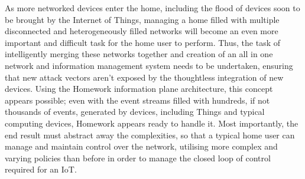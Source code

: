 As more networked devices enter the home, including the flood of devices soon to be brought by the Internet of Things, managing a home filled with multiple disconnected and heterogeneously filled networks will become an even more important and difficult task for the home user to perform. Thus, the task of intelligently merging these networks together and creation of an all in one network and information management system needs to be undertaken, ensuring that new attack vectors aren't exposed by the thoughtless integration of new devices. Using the Homework information plane architecture, this concept appears possible; even with the event streams filled with hundreds, if not thousands of events, generated by devices, including Things and typical computing devices, Homework appears ready to handle it\cite{DEBSChallenge}. Most importantly, the end result must abstract away the complexities, so that a typical home user can manage and maintain control over the network, utilising more complex and varying policies than before in order to manage the closed loop of control required for an IoT.
